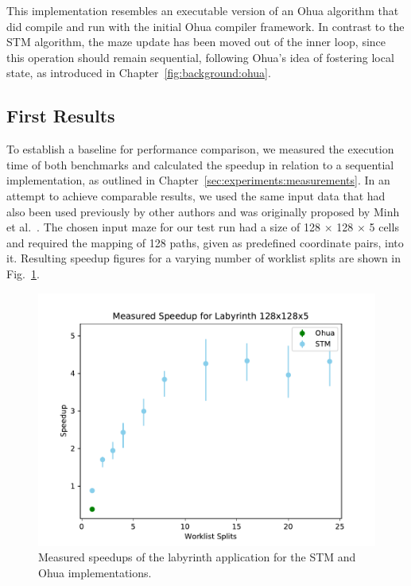 This implementation resembles an executable version of an Ohua algorithm that did compile and run with the initial Ohua compiler framework.
In contrast to the STM algorithm, the maze update has been moved out of the inner loop, since this operation should remain sequential, following Ohua's idea of fostering local state, as introduced in Chapter~\ref{fig:background:ohua}.

\subsection{First Results}

To establish a baseline for performance comparison, we measured the execution time of both benchmarks and calculated the speedup in relation to a sequential implementation, as outlined in Chapter~\ref{sec:experiments:measurements}.
In an attempt to achieve comparable results, we used the same input data that had also been used previously by other authors and was originally proposed by Minh et al.~\cite{minh2008stamp}.
The chosen input maze for our test run had a size of 128 $\times$ 128 $\times$ 5 cells and required the mapping of 128 paths, given as predefined coordinate pairs, into it.
Resulting speedup figures for a varying number of worklist splits are shown in Fig.~\ref{fig:preliminaries:initial-results}.

\begin{figure}[h]
    \centering
    \includegraphics[width=.5\textwidth,keepaspectratio]{gfx/preliminaries-labyrinth/2019-04-18-128x128x5}
    \caption{Measured speedups of the labyrinth application for the STM and Ohua implementations.}%
    \label{fig:preliminaries:initial-results}
\end{figure}

